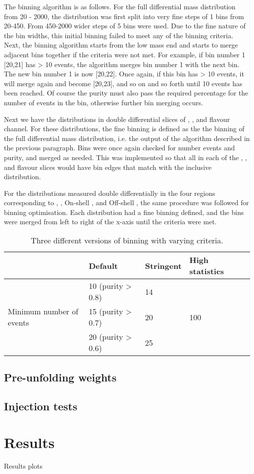 The binning algorithm is as follows. For the full \mFourL differential mass distribution from \unit{20}{\Gev} - \unit{2000}{\GeV}, the distribution was first split into very fine steps of \unit{1}{\GeV} bins from \unit{20}{\Gev}-\unit{450}{\GeV}. From \unit{450}{\Gev}-\unit{2000}{\GeV} wider steps of \unit{5}{\GeV} bins were used. Due to the fine nature of the bin widths, this initial binning failed to meet any of the binning criteria. Next, the binning algorithm starts from the low mass end and starts to merge adjacent bins together if the criteria were not met. For example, if bin number 1 [20,21] has > 10 events, the algorithm merges bin number 1 with the next bin. The new bin number 1 is now [20,22]. Once again, if this bin has > 10 events, it will merge again and become [20,23], and so on and so forth until 10 events has been reached. Of course the purity must also pass the required percentage for the number of events in the bin, otherwise further bin merging occurs.  

Next we have the \mFourL distributions in double differential slices of \ptFourL, \yFourL, and flavour channel. For these distributions, the fine binning is defined as the the binning of the full \mFourL differential mass distribution, i.e. the output of the algorithm described in the previous paragraph. Bins were once again checked for number events and purity, and merged as needed. This was implemented so that all \mFourL in each of the  \ptFourL, \yFourL, and flavour slices would have bin edges that match with the inclusive distribution. 

For the distributions measured double differentially in the four \mFourL regions corresponding to \Z, \Higgs, On-shell \ZZ, and Off-shell \ZZ, the same procedure was followed for binning optimisation. Each distribution had a fine binning defined, and the bins were merged from left to right of the x-axis until the criteria were met. 

\begin{table}[bp]
  \begin{tabular}{lllll}
                & Default              & Stringent              & High statistics             \\
    \midrule
                                & 10 (purity > 0.8)   & 14 &   \\
     Minimum number of events & 15 (purity > 0.7) & 20 & 100    \\
                                &20 (purity > 0.6) & 25 &    \\
  \end{tabular}
  \caption{Three different versions of binning with varying criteria.}
  \label{tab:BinningVersions}
\end{table}

\subsection{Pre-unfolding weights}
\label{subsec:preuf}



\subsection{Injection tests}
\label{subsec:injection}


\section{Results}
\label{sec:results}

Results plots